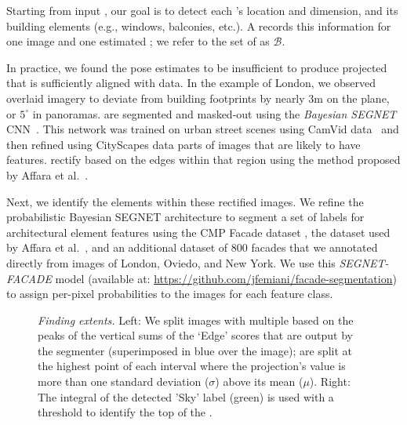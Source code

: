 
Starting from input \streetI, our goal is to detect each \facade's location and dimension, and its building elements (e.g., windows, balconies, etc.). A \emph{\buildingfacade} records this information for one image and one estimated \facade; we refer to the set of \buildingfacades as $\mathcal{B}$.

In practice, we found the \GSV pose estimates to be insufficient to produce projected \streetI that is sufficiently aligned with \GIS data. In the example of London, we observed overlaid \GSV imagery to deviate from \GIS building footprints by nearly 3m on the \facade plane, or $5^\circ$ in \GSV panoramas. 
 are segmented and masked-out using the \emph{Bayesian SEGNET} CNN~\cite{kendall2015bayesian,badrinarayanan2017segnet}. This network was trained on urban street scenes using CamVid data~\cite{BrostowSFC:ECCV08} and then refined using CityScapes data \cite{Cordts2016Cityscapes}  parts of images that are likely to have \facade features.  rectify based on the edges within that region using the method proposed by Affara et al.~. %

Next, we identify the \facade elements within these rectified images. We refine the probabilistic Bayesian SEGNET architecture to segment a set of labels for architectural \facade element features using the CMP Facade dataset \cite{tylecek2012cmp}, the dataset used by Affara et al.~, and an additional dataset of 800 facades that we annotated directly from \GSV images of London, Oviedo, and New York. We use this \emph{SEGNET-FACADE} model (available at: \url{https://github.com/jfemiani/facade-segmentation}) to assign per-pixel probabilities to the images for each feature class. 


\begin{figure}[t!]

  \def\svgwidth{\columnwidth}  
    
\caption{{\it Finding \facade extents.} Left: We split images with multiple \facades based on the peaks of the vertical sums of the \facade `Edge' scores that are output by the segmenter (superimposed in blue over the image); \facades are split at the highest point of each interval where the projection's value is more than one standard deviation ($\sigma$) above its mean ($\mu$). Right: The integral of the detected 'Sky' label (green) is used with a threshold to identify the top of the \facade.}
\label{fig:facade-cuts} 
\end{figure}



